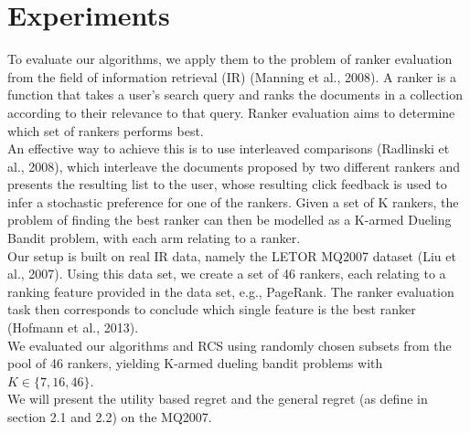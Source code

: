 \documentclass{llncs}
\begin{document}
 
	
		
\section{Experiments}

To evaluate our algorithms, we apply them to the problem of
ranker evaluation from the field of information retrieval
(IR) (Manning et al., 2008). A ranker is a
function that takes a user's search query and
ranks the documents in a collection according to their
relevance to that query. Ranker evaluation aims to determine
which set of rankers performs best.
\\
An effective way to achieve this is to use interleaved
comparisons (Radlinski et al., 2008), which interleave
the documents proposed by two different rankers and
presents the resulting list to the user, whose resulting
click feedback is used to infer a stochastic preference
for one of the rankers. Given a set of K rankers, the
problem of finding the best ranker can then be modelled 
as a K-armed Dueling Bandit problem, with each
arm relating to a ranker.
\\
Our setup is built on real IR data,
namely the LETOR MQ2007 dataset (Liu et al., 2007).
Using this data set, we create a set of 46 rankers, each
relating to a ranking feature provided in the
data set, e.g., PageRank. The ranker evaluation task
then corresponds to conclude which single feature
is the best ranker (Hofmann et al., 2013).
\\
We evaluated our algorithms and RCS
using randomly chosen subsets from the pool of 46
rankers, yielding K-armed dueling bandit problems
with $K\in \{7, 16, 46\}$. 
\\
We will present the utility based regret and the general regret (as define in section 2.1 and 2.2) on the MQ2007. 
\newpage
\end{document}
